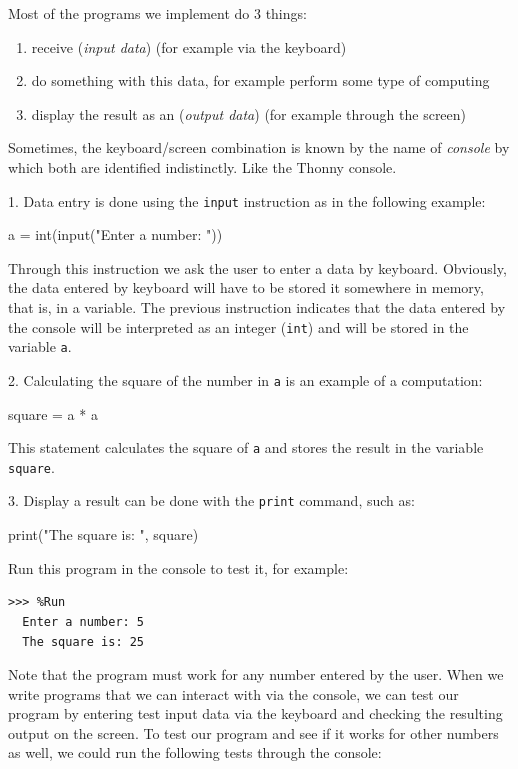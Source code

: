 Most of the programs we implement do 3 things:
\begin{enumerate}[nosep]
\item receive ({\em input data}) (for example via the keyboard)
\item do something with this data, for example perform some type of computing
\item display the result as an ({\em output data}) (for example through the screen)
\end{enumerate}

Sometimes, the keyboard/screen combination is known by the name of {\em console} by which both are identified indistinctly. Like the Thonny console.

1. Data entry is done using the \verb+input+ instruction as in the following example:
\begin{python}[frame=single]
     a = int(input("Enter a number: "))
\end{python}
Through this instruction we ask the user to enter a data by keyboard. Obviously, the data entered by keyboard will have to be
stored it somewhere in memory, that is, in a variable.
The previous instruction indicates that the data entered by the console will be interpreted as an integer (\verb+int+) and will be stored in the variable \verb+a+.

2. Calculating the square of the number in \verb+a+ is an example of a computation:

\begin{python}[frame=single]
     square = a * a
\end{python}

This statement calculates the square of \verb+a+ and stores the result in the variable \verb+square+.

3. Display a result can be done with the \verb+print+ command, such as:

\begin{python}[frame=single]
     print("The square is: ", square)
\end{python}

Run this program in the console to test it, for example:
\begin{Verbatim}[frame=single, label={\em example of execution}]
>>> %Run 
  Enter a number: 5
  The square is: 25
\end{Verbatim}

Note that the program must work for any number entered by the user. When we write programs that we can interact with via the console, we can test our program by entering test input data via the keyboard and checking the resulting output on the screen.
To test our program and see if it works for other numbers as well, we could run the following tests through the console:

